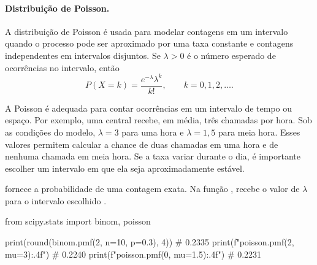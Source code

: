 \paragraph{Distribuição de Poisson.}
A distribuição de Poisson é usada para modelar contagens em um intervalo quando o processo pode ser aproximado por uma taxa constante e contagens independentes em intervalos disjuntos. Se \(\lambda>0\) é o número esperado de ocorrências no intervalo, então
\[
  P(X=k)=\frac{e^{-\lambda}\lambda^k}{k!},
  \qquad k=0,1,2,\ldots.
\]

A Poisson é adequada para contar ocorrências em um intervalo de tempo ou espaço. Por exemplo, uma central recebe, em média, três chamadas por hora. Sob as condições do modelo, \(\lambda=3\) para uma hora e \(\lambda=1{,}5\) para meia hora. Esses valores permitem calcular a chance de duas chamadas em uma hora e de nenhuma chamada em meia hora. Se a taxa variar durante o dia, é importante escolher um intervalo em que ela seja aproximadamente estável.

 fornece a probabilidade de uma contagem exata. Na função ,  recebe o valor de \(\lambda\) para o intervalo escolhido \cite{scipy}.

\begin{exemplo}
from scipy.stats import binom, poisson

print(round(binom.pmf(2, n=10, p=0.3), 4))  # 0.2335
print(f"{poisson.pmf(2, mu=3):.4f}")       # 0.2240
print(f"{poisson.pmf(0, mu=1.5):.4f}")     # 0.2231
\end{exemplo}
